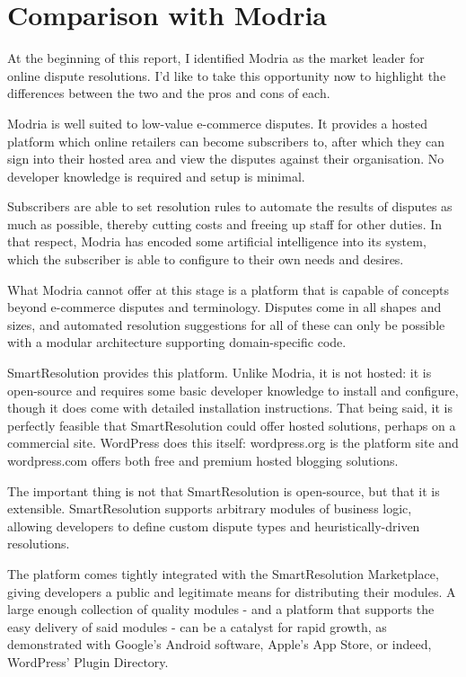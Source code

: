\section{Comparison with Modria}

At the beginning of this report, I identified Modria as the market leader for online dispute resolutions. I'd like to take this opportunity now to highlight the differences between the two and the pros and cons of each.

Modria is well suited to low-value e-commerce disputes. It provides a hosted platform which online retailers can become subscribers to, after which they can sign into their hosted area and view the disputes against their organisation. No developer knowledge is required and setup is minimal.

Subscribers are able to set resolution rules to automate the results of disputes as much as possible, thereby cutting costs and freeing up staff for other duties. In that respect, Modria has encoded some artificial intelligence into its system, which the subscriber is able to configure to their own needs and desires.

What Modria cannot offer at this stage is a platform that is capable of concepts beyond e-commerce disputes and terminology. Disputes come in all shapes and sizes, and  automated resolution suggestions for all of these can only be possible with a modular architecture supporting domain-specific code.

SmartResolution provides this platform. Unlike Modria, it is not hosted: it is open-source and requires some basic developer knowledge to install and configure, though it does come with detailed installation instructions. That being said, it is perfectly feasible that SmartResolution could offer hosted solutions, perhaps on a commercial site. WordPress does this itself: wordpress.org is the platform site and wordpress.com offers both free and premium hosted blogging solutions.

The important thing is not that SmartResolution is open-source, but that it is extensible. SmartResolution supports arbitrary modules of business logic, allowing developers to define custom dispute types and heuristically-driven resolutions.

The platform comes tightly integrated with the SmartResolution Marketplace, giving developers a public and legitimate means for distributing their modules. A large enough collection of quality modules - and a platform that supports the easy delivery of said modules - can be a catalyst for rapid growth, as demonstrated with Google's Android software, Apple's App Store, or indeed, WordPress' Plugin Directory.

